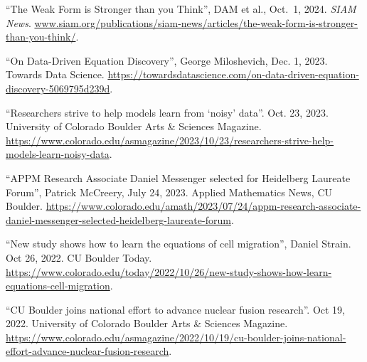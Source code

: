 \documentclass[letterpaper,11pt,oneside]{article}
\begin{document}
\begin{sloppypar}
\begin{enumerate}[label={[\arabic*]}]
\item 
\raggedright``The Weak Form is Stronger than you Think'', DAM et al., Oct.\ 1, 2024. {\it SIAM News}. {\footnotesize\url{www.siam.org/publications/siam-news/articles/the-weak-form-is-stronger-than-you-think/}}.
\item 
\raggedright``On Data-Driven Equation Discovery'', George Miloshevich, Dec. 1, 2023. Towards Data Science. {\footnotesize\url{https://towardsdatascience.com/on-data-driven-equation-discovery-5069795d239d}}.
\item 
\raggedright``Researchers strive to help models learn from ‘noisy’ data''. Oct. 23, 2023. University of Colorado Boulder Arts \& Sciences Magazine. {\footnotesize\url{https://www.colorado.edu/asmagazine/2023/10/23/researchers-strive-help-models-learn-noisy-data}}.
\item 
\raggedright``APPM Research Associate Daniel Messenger selected for Heidelberg Laureate Forum'', Patrick McCreery, July 24, 2023. Applied Mathematics News, CU Boulder. {\footnotesize\url{https://www.colorado.edu/amath/2023/07/24/appm-research-associate-daniel-messenger-selected-heidelberg-laureate-forum}}.
\item \raggedright``New study shows how to learn the equations of cell migration'', Daniel Strain. Oct 26, 2022. CU Boulder Today. {\footnotesize\url{https://www.colorado.edu/today/2022/10/26/new-study-shows-how-learn-equations-cell-migration}}.
\item 
\raggedright``CU Boulder joins national effort to advance nuclear fusion research''. Oct 19, 2022. University of Colorado Boulder Arts \& Sciences Magazine. {\footnotesize\url{https://www.colorado.edu/asmagazine/2022/10/19/cu-boulder-joins-national-effort-advance-nuclear-fusion-research}}.
\end{enumerate}
\end{sloppypar}
\end{document}
